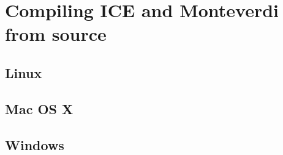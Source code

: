 \setcounter{secnumdepth}{3}

\chapter{Compiling ICE and Monteverdi from source}
\label{chapter:CompilingIceandMonteverdi}

\section{Linux}
\section{Mac OS X}
\section{Windows}
